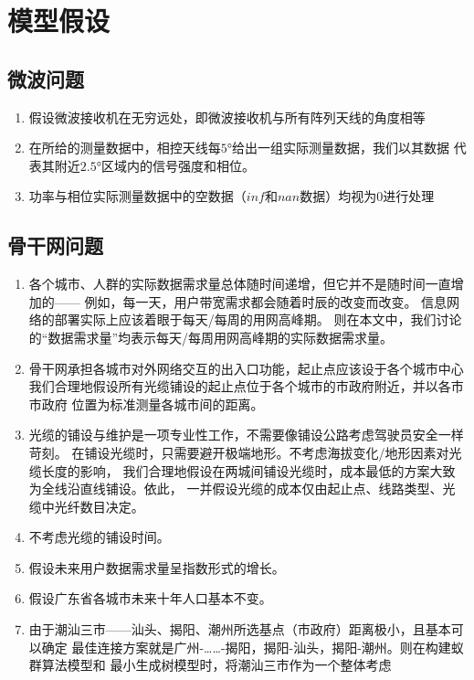 \documentclass[UTF8,12pt]{ctexart}
\begin{document}
        



\section{模型假设}\label{mxjs}
    \subsection{微波问题}
        \begin{enumerate}
            \item 假设微波接收机在无穷远处，即微波接收机与所有阵列天线的角度相等
            \item 在所给的测量数据中，相控天线每$5°$给出一组实际测量数据，我们以其数据
                代表其附近$2.5°$区域内的信号强度和相位。
            \item 功率与相位实际测量数据中的空数据（$inf$和$nan$数据）均视为0进行处理
        \end{enumerate}
    

    \subsection{骨干网问题}
        \begin{enumerate}
            \item 各个城市、人群的实际数据需求量总体随时间递增，但它并不是随时间一直增加的——
                例如，每一天，用户带宽需求都会随着时辰的改变而改变。
                信息网络的部署实际上应该着眼于每天/每周的用网高峰期。
                则在本文中，我们讨论的“数据需求量”均表示每天/每周用网高峰期的实际数据需求量。

            \item 骨干网承担各城市对外网络交互的出入口功能，起止点应该设于各个城市中心
                我们合理地假设所有光缆铺设的起止点位于各个城市的市政府附近，并以各市市政府
                位置为标准测量各城市间的距离。
            
            \item 光缆的铺设与维护是一项专业性工作，不需要像铺设公路考虑驾驶员安全一样苛刻。
                在铺设光缆时，只需要避开极端地形。不考虑海拔变化/地形因素对光缆长度的影响，
                我们合理地假设在两城间铺设光缆时，成本最低的方案大致为全线沿直线铺设。依此，
                一并假设光缆的成本仅由起止点、线路类型、光缆中光纤数目决定。

            \item 不考虑光缆的铺设时间。
            \item 假设未来用户数据需求量呈指数形式的增长。
            \item 假设广东省各城市未来十年人口基本不变。
            \item 由于潮汕三市——汕头、揭阳、潮州所选基点（市政府）距离极小，且基本可以确定
                最佳连接方案就是广州-……-揭阳，揭阳-汕头，揭阳-潮州。则在构建蚁群算法模型和
                最小生成树模型时，将潮汕三市作为一个整体考虑
        \end{enumerate}
\end{document}
